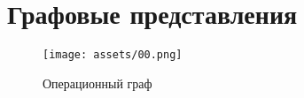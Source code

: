 \chapter{Графовые представления}

\begin{figure}[h!]
	\begin{center}
		\texttt{[image: assets/00.png]}
	\end{center}
	\caption{Операционный граф}
\end{figure}
